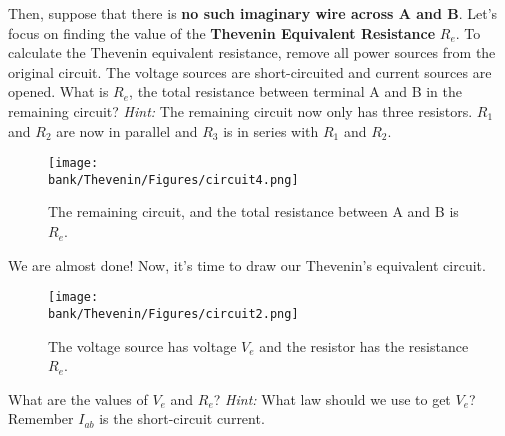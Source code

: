 \begin{enumerate}

  \qitem Then, suppose that there is \textbf{no such imaginary wire across A and B}. Let's focus on finding the value of the \textbf{Thevenin Equivalent Resistance} $R_e$. 
  To calculate the Thevenin equivalent resistance, remove all power sources from the original circuit. The voltage
  sources are short-circuited and current sources are opened. What is $R_e$, the total resistance between terminal A and B in the remaining circuit?
  \newline\emph{Hint:} The remaining circuit now only has three resistors. $R_1$ and $R_2$ are now in parallel and $R_3$
  is in series with $R_1$ and $R_2$. 
  \begin{figure}[H]
    \centering
    \texttt{[image: \\bank/Thevenin/Figures/circuit4.png]}
    \caption{The remaining circuit, and the total resistance between A and B is $R_e$.}
    \label{A Circuit problem}
  \end{figure}

  \qitem We are almost done! Now, it's time to draw our Thevenin's equivalent circuit.
  \begin{figure}[H]
    \centering
    \texttt{[image: \\bank/Thevenin/Figures/circuit2.png]}
    \caption{The voltage source has voltage $V_e$ and the resistor has the resistance $R_e$.}
    \label{A Circuit problem}
  \end{figure}
  What are the values of $V_e$ and $R_e$?
  \newline\emph{Hint:} What law should we use to get $V_e$? Remember $I_{ab}$ is the short-circuit current.

  \end{enumerate}

